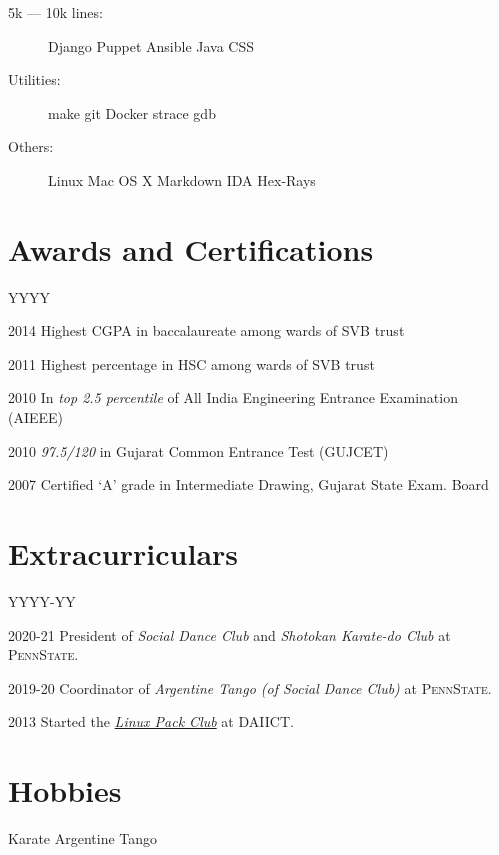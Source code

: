 \documentclass[margin]{res}
\newcommand{\daiict}{\textsc{DAIICT}}
\newcommand{\psu}{\textsc{PennState}}
\begin{document}
\begin{resume}
\begin{description}
    \item[5k --- 10k lines:]
        Django \textbullet{}
        Puppet \textbullet{}
        Ansible \textbullet{}
        Java \textbullet{}
        CSS

    \item[Utilities:]
        make \textbullet{}
        git \textbullet{}
        Docker \textbullet{}
        strace \textbullet{}
        gdb

    \item[Others:]
        Linux \textbullet{}
        Mac OS X \textbullet{}
        Markdown \textbullet{}
        IDA Hex-Rays
\end{description}

\section{Awards and Certifications}
\begin{labeling}{YYYY}
\item[2014] Highest CGPA in baccalaureate among wards of SVB trust
\item[2011] Highest percentage in HSC among wards of SVB trust
\item[2010] In \emph{top 2.5 percentile} of All India Engineering Entrance Examination (AIEEE)
\item[2010] \emph{97.5/120} in Gujarat Common Entrance Test (GUJCET)
\item[2007] Certified `A' grade in Intermediate Drawing, Gujarat State Exam. Board
\end{labeling}

\section{Extracurriculars}

\begin{labeling}{YYYY-YY}
\item[2020-21] President of \emph{Social Dance Club} and \emph{Shotokan Karate-do Club} at \psu.
\item[2019-20] Coordinator of \emph{Argentine Tango (of Social Dance Club)} at \psu. %
\item[2013] Started the \href{http://lpdaiict.wordpress.com/}{\itshape Linux Pack Club} at \daiict.
\end{labeling}


\section{Hobbies}
    Karate \textbullet{}
    Argentine Tango

\end{resume} 
\end{document}
